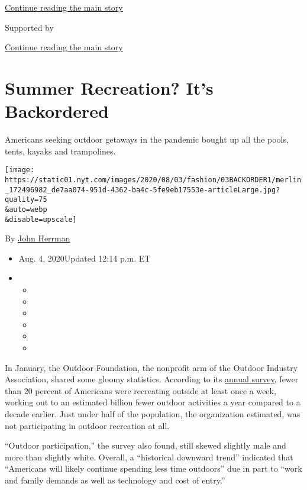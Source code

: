 \protect\hyperlink{after-top}{Continue reading the main story}

Supported by

\protect\hyperlink{after-sponsor}{Continue reading the main story}

\hypertarget{summer-recreation-its-backordered}{%
\section{Summer Recreation? It's
Backordered}\label{summer-recreation-its-backordered}}

Americans seeking outdoor getaways in the pandemic bought up all the
pools, tents, kayaks and trampolines.

\texttt{[image: https://static01.nyt.com/images/2020/08/03/fashion/03BACKORDER1/merlin\_172496982\_de7aa074-951d-4362-ba4c-5fe9eb17553e-articleLarge.jpg?quality=75\\\&auto=webp\\\&disable=upscale]}

By \href{https://www.nytimes.com/by/john-herrman}{John Herrman}

\begin{itemize}
\item
  Aug. 4, 2020Updated 12:14 p.m. ET
\item
  \begin{itemize}
  \item
  \item
  \item
  \item
  \item
  \item
  \end{itemize}
\end{itemize}

In January, the Outdoor Foundation, the nonprofit arm of the Outdoor
Industry Association, shared some gloomy statistics. According to its
\href{https://outdoorindustry.org/resource/2019-outdoor-participation-report/}{annual
survey}, fewer than 20 percent of Americans were recreating outside at
least once a week, working out to an estimated billion fewer outdoor
activities a year compared to a decade earlier. Just under half of the
population, the organization estimated, was not participating in outdoor
recreation at all.

``Outdoor participation,'' the survey also found, still skewed slightly
male and more than slightly white. Overall, a ``historical downward
trend'' indicated that ``Americans will likely continue spending less
time outdoors'' due in part to ``work and family demands as well as
technology and cost of entry.''


